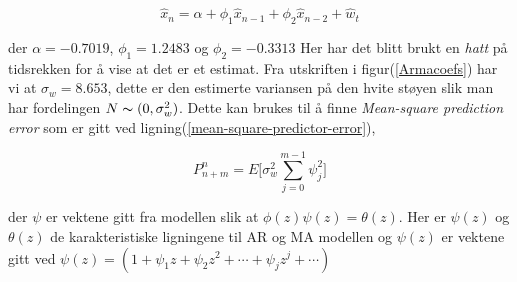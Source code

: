 \begin{equation}
\hat{x}_{n} = \alpha + \phi_{1}\hat{x}_{n-1} + \phi_{2}\hat{x}_{n-2} + \hat{w}_{t}
\end{equation}

der $\alpha = -0.7019$, $\phi_{1} = 1.2483$ og $\phi_{2} = -0.3313$
Her har det blitt brukt en \emph{hatt} på tidsrekken for å vise at det er et estimat. Fra utskriften i figur(\ref{Armacoefs}) har vi at $\sigma_{w} = 8.653$, dette er den estimerte variansen på den hvite støyen slik man har fordelingen $N \thicksim (0, \sigma_{w}^{2})$. Dette kan brukes til å finne \emph{Mean-square prediction error} som er gitt ved ligning(\ref{mean-square-predictor-error}),

\begin{equation}
    P^{n}_{n + m} = E\bigg[\sigma_{w}^{2}\sum_{j = 0}^{m-1}\psi_{j}^{2}\bigg]
    \label{mean-square-predictor-error}
\end{equation}

der $\psi$ er vektene gitt fra modellen slik at $\phi(z)\psi(z) = \theta(z)$. Her er $\psi(z)$ og $\theta(z)$ de karakteristiske ligningene til AR og MA modellen og $\psi(z)$ er vektene gitt ved $\psi(z) = (1 + \psi_{1}z + \psi_{2}z^2 + \cdots + \psi_{j}z^{j}+\cdots)$

